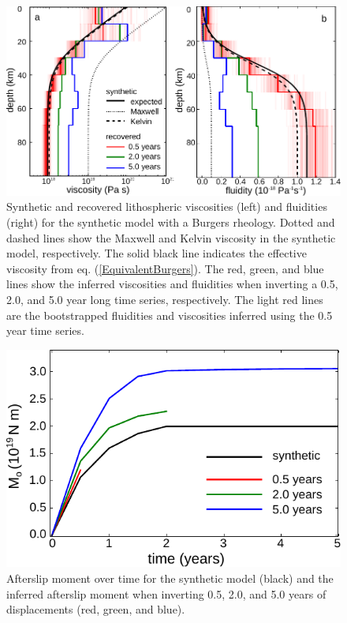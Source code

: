 \begin{figure}
\includegraphics{ch2/figures/Fig8.pdf}
\caption{Synthetic and recovered lithospheric viscosities (left) and
fluidities (right) for the synthetic model with a Burgers rheology.
Dotted and dashed lines show the Maxwell and Kelvin viscosity in the
synthetic model, respectively.  The solid black line indicates the
effective viscosity from eq. (\ref{EquivalentBurgers}).  The red,
green, and blue lines show the inferred viscosities and fluidities
when inverting a 0.5, 2.0, and 5.0 year long time series,
respectively.  The light red lines are the bootstrapped fluidities and
viscosities inferred using the 0.5 year time series.}
\label{figure8}
\end{figure}

\begin{figure}
\includegraphics{ch2/figures/Fig9.pdf}
\caption{Afterslip moment over time for the synthetic model (black)
and the inferred afterslip moment when inverting 0.5, 2.0, and 5.0
years of displacements (red, green, and blue).}
\label{figure9}
\end{figure}

